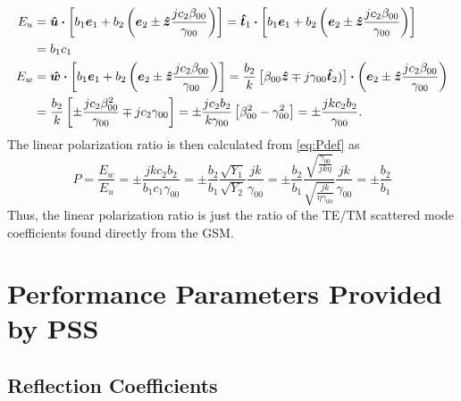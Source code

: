 \documentclass[11pt]{article}
\begin{document}
\begin{align}
  E_u 
  &= \boldsymbol{\hat{u}} \boldsymbol{\cdot} 
  \left[b_1 \boldsymbol{e}_1 + b_2 
    \left(
      \boldsymbol{e}_2 \pm \boldsymbol{\hat{z}} \frac{jc_2\beta_{00}}{\gamma_{00}}
    \right)
  \right] 
  = \boldsymbol{\hat{t}}_1 \boldsymbol{\cdot} 
  \left[b_1 \boldsymbol{e}_1 + b_2 
    \left(
      \boldsymbol{e}_2 \pm \boldsymbol{\hat{z}} \frac{jc_2\beta_{00}}{\gamma_{00}}
    \right)
  \right] \nonumber \\
  &= b_1 c_1  \\
  E_w
  &= \boldsymbol{\hat{w}} \boldsymbol{\cdot} \left[b_1 \boldsymbol{e}_1 + b_2 
    \left(
      \boldsymbol{e}_2 \pm \boldsymbol{\hat{z}} \frac{jc_2\beta_{00}}{\gamma_{00}}
    \right)
  \right]
  = 
  \frac{b_2}{k} 
  \left[
    \beta_{00} \boldsymbol{\hat{z}}
    \mp j \gamma_{00} \boldsymbol{\hat{t}}_2) 
  \right] 
  \boldsymbol{\cdot} 
  \left(
    \boldsymbol{e}_2 \pm \boldsymbol{\hat{z}} \frac{jc_2\beta_{00}}{\gamma_{00}}
  \right) \nonumber \\
  &=
  \frac{b_2}{k} 
  \left[
    \pm \frac{jc_2\beta_{00}^2}{\gamma_{00}}
    \mp j c_2 \gamma_{00} 
  \right]
  =
  \pm \frac{j c_2 b_2}{k\gamma_{00}}
  \left[
    \beta_{00}^2 - \gamma_{00}^2
  \right]
  =
  \pm \frac{jk c_2 b_2}{\gamma_{00}}.
\end{align}
The linear polarization ratio is then calculated 
from \eqref{eq:Pdef} as
\begin{equation}
  P = \frac{E_w}{E_u}
  =   \pm \frac{jk c_2 b_2}{b_1 c_1 \gamma_{00}}
  = \pm \frac{b_2}{b_1} \frac{\sqrt{Y_1}}{\sqrt{Y_2}} \frac{jk}{\gamma_{00}}
  = \pm \frac{b_2}{b_1} 
  \frac{\sqrt{\frac{\gamma_{00}}{jk\eta}}}%
  {\sqrt{\frac{jk}{\eta\gamma_{00}}}} 
  \frac{jk}{\gamma_{00}}
  = \pm \frac{b_2}{b_1}
\end{equation}
Thus, the linear polarization ratio is just the ratio of the TE/TM
scattered mode coefficients found directly from the GSM.


\newpage
\section{Performance Parameters Provided by PSS}

\subsection{Reflection Coefficients}
\end{document}
